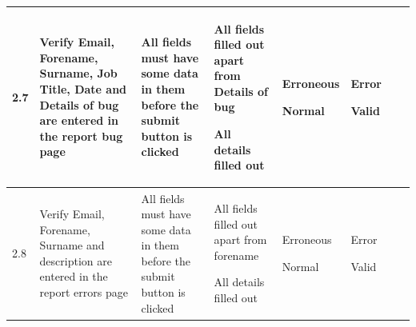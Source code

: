 \begin{landscape}
\begin{center}
\begin{longtable}{|p{1.5cm}|p{2cm}|p{2.5cm}|p{4cm}|p{2cm}|p{2cm}|p{1cm}|p{1.7cm}|}
2.7 & Verify Email, Forename, Surname, Job Title, Date and Details of bug are entered in the report bug page & All fields must have some data in them before the submit  button is clicked & All fields filled out apart from Details of bug \par \bigskip All details filled out & Erroneous \par \bigskip \bigskip Normal & Error \par\bigskip \bigskip Valid && \\ \hline
2.8 & Verify Email, Forename, Surname and description are entered in the report errors page & All fields must have some data in them before the submit  button is clicked & All fields filled out apart from forename \par \bigskip All details filled out & Erroneous \par \bigskip \bigskip Normal & Error \par \bigskip \bigskip Valid && \\ \hline


\end{longtable}
\end{center}
\end{landscape}
